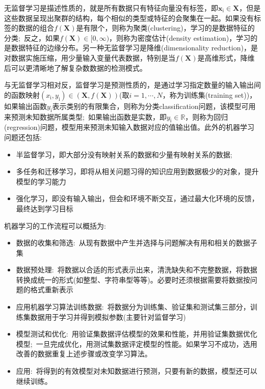 无监督学习是描述性质的，就是所有数据只有特征向量没有标签，即$\mathbf{x}_{\mathrm{i}}\in\mathbf{X}$，但是这些数据呈现出聚群的结构，每个相似的类型或特征的会聚集在一起。如果没有标签的数据的组合$f(\mathbf{X})$是有限个，则称为聚类\textrm{(clustering)}，学习的是数据特征的分类;~反之，如果$f(\mathbf{X})\in[0,\infty)$，则称为密度估计\textrm{(density estimation)}，学习的是数据特征的边缘分布。另一种无监督学习是降维\textrm{(dimensionality reduction)}，是对数据实施压缩，用少量输入变量代表数据，特别是当$f(\mathbf{X})$是高维形式，降维后可以更清晰地了解复杂数数据的检测模式。

与无监督学习相对反，监督学习是预测性质的，是通过学习指定数量的输入输出间的函数映射$(x_{\mathrm{i}},y_{\mathrm{i}})\in(\mathbf{X},f(\mathbf{X}))$(取$i=1,\cdots,N$，称为训练集\textrm{(training set)})，如果输出函数$y_{\mathrm{i}}$表示类别的有限集合，则称为分类\textrm{classification}问题，该模型可用来预测未知数据所属类型;~如果输出函数是实数，即$y_\mathrm{i}\in\mathbb{R}$，则称为回归\textrm{(regression)}问题，模型用来预测未知输入数据对应的值输出值。此外的机器学习问题还包括:~
\begin{itemize}
	\item 半监督学习，即大部分没有映射关系的数据和少量有映射关系的数据;
	\item 多任务和迁移学习，即将从相关问题习得的知识应用到数据极少的对象，提升模型的学习能力
	\item 强化学习，即没有输入输出，但会和环境不断交互，通过最大化环境的反馈，最终达到学习目标
\end{itemize}

机器学习的工作流程可以概括为\cite{Efficient_ML}:
\begin{itemize}
	\item 数据的收集和筛选:~从现有数据中产生并选择与问题解决有用和相关的数据子集
	\item 数据预处理:~将数据以合适的形式表示出来，清洗缺失和不完整数据，将数据转换成统一的形式(如整型、字符串型等等)。必要时还须根据需要将数据按问题的格式重新表示
	\item 应用机器学习算法训练数据:~将数据分为训练集、验证集和测试集三部分，训练集数据用于学习并得到模拟参数(主要针对监督学习)
	\item 模型测试和优化:~用验证集数据评估模型的效果和性能，并用验证集数据优化模型;~一旦完成优化，用测试集数据评定模型的性能。如果学习不成功，选用改善的数据重复上述步骤或改变学习算法。
	\item 应用:~将得到的有效模型对未知数据进行预测，只要有新的数据，模型还可以继续训练。
\end{itemize}

